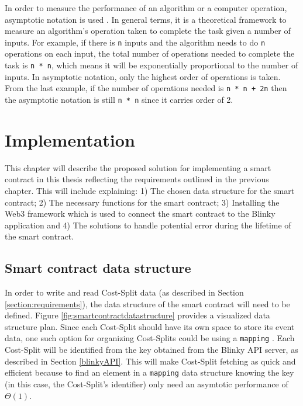 \documentclass[twoside,numperchapter]{tutthesis} %
\begin{document}
In order to measure the performance of an algorithm or a computer operation, asymptotic notation is used \citep{AlgorithmAndDataStructure}. In general terms, it is a theoretical framework to measure an algorithm's operation taken to complete the task given a number of inputs. For example, if there is \texttt{n} inputs and the algorithm needs to do \texttt{n} operations on each input, the total number of operations needed to complete the task is \texttt{n * n}, which means it will be exponentially proportional to the number of inputs. In asymptotic notation, only the highest order of operations is taken. From the last example, if the number of operations needed is \texttt{n * n + 2n} then the asymptotic notation is still \texttt{n * n} since it carries order of 2.

\chapter{Implementation}
\label{ch:implementation}

This chapter will describe the proposed solution for implementing a smart contract in this thesis reflecting the requirements outlined in the previous chapter. This will include explaining: 1) The chosen data structure for the smart contract; 2) The necessary functions for the smart contract; 3) Installing the Web3 framework which is used to connect the smart contract to the Blinky application and 4) The solutions to handle potential error during the lifetime of the smart contract.

\section{Smart contract data structure}
\label{section:DataStructure}

In order to write and read Cost-Split data (as described in Section \ref{section:requirements}), the data structure of the smart contract will need to be defined. Figure \ref{fig:smartcontractdatastructure} provides a visualized data structure plan. Since each Cost-Split should have its own space to store its event data, one such option for organizing Cost-Splits could be using a \texttt{mapping} \citep{SolidityMapping}. Each Cost-Split will be identified from the key obtained from the Blinky API server, as described in Section \ref{blinkyAPI}. This will make Cost-Split fetching as quick and efficient because to find an element in a \texttt{mapping} data structure knowing the key (in this case, the Cost-Split's identifier) only need an asymtotic performance of $\Theta(1)$. 
\end{document}
